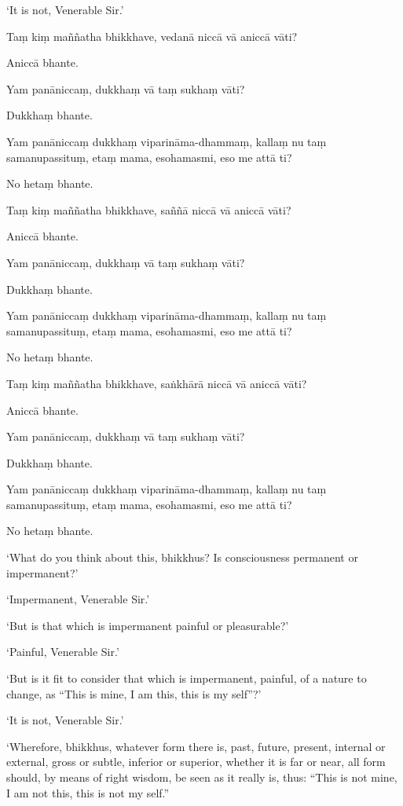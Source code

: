 ‘It is not, Venerable Sir.’

\clearpage

\paliText
\markboth{\paliTitle}{\rightmark}

Taṃ kiṃ maññatha bhikkhave, vedanā niccā vā aniccā vāti?

Aniccā bhante.

Yam panāniccaṃ, dukkhaṃ vā taṃ sukhaṃ vāti?

Dukkhaṃ bhante.

Yam panāniccaṃ dukkhaṃ viparināma-dhammaṃ, kallaṃ nu taṃ samanupassituṃ,
etaṃ mama, esohamasmi, eso me attā ti?

No hetaṃ bhante.

Taṃ kiṃ maññatha bhikkhave, saññā niccā vā aniccā vāti?

Aniccā bhante.

Yam panāniccaṃ, dukkhaṃ vā taṃ sukhaṃ vāti?

Dukkhaṃ bhante.

Yam panāniccaṃ dukkhaṃ viparināma-dhammaṃ, kallaṃ nu taṃ samanupassituṃ,
etaṃ mama, esohamasmi, eso me attā ti?

No hetaṃ bhante.

Taṃ kiṃ maññatha bhikkhave, saṅkhārā niccā vā aniccā vāti?

Aniccā bhante.

Yam panāniccaṃ, dukkhaṃ vā taṃ sukhaṃ vāti?

Dukkhaṃ bhante.

Yam panāniccaṃ dukkhaṃ viparināma-dhammaṃ, kallaṃ nu taṃ samanupassituṃ,
etaṃ mama, esohamasmi, eso me attā ti?

No hetaṃ bhante.

\clearpage

\englishText
\markboth{\englishTitle}{\rightmark}

‘What do you think about this, bhikkhus? Is consciousness permanent or
impermanent?’

‘Impermanent, Venerable Sir.’

‘But is that which is impermanent painful or pleasurable?’

‘Painful, Venerable Sir.’

‘But is it fit to consider that which is impermanent, painful, of a
nature to change, as “This is mine, I am this, this is my self”?’

‘It is not, Venerable Sir.’

‘Wherefore, bhikkhus, whatever form there is, past, future, present,
internal or external, gross or subtle, inferior or superior, whether it
is far or near, all form should, by means of right wisdom, be seen as it
really is, thus: “This is not mine, I am not this, this is not my self.”


